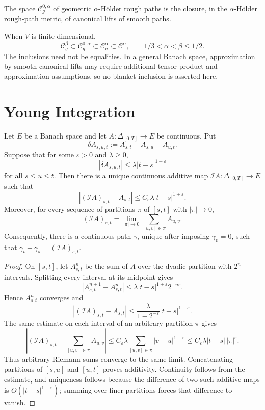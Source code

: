 \begin{de}
The space $\mathscr C_g^{0,\alpha}$ of geometric $\alpha$-Hölder rough paths is
the closure, in the $\alpha$-Hölder rough-path metric, of canonical lifts of
smooth paths.
\end{de}

\begin{remark}
When $V$ is finite-dimensional,
\[
  \mathscr C_g^\beta\subset\mathscr C_g^{0,\alpha}
  \subset\mathscr C_g^\alpha\subset\mathscr C^\alpha,
  \qquad 1/3<\alpha<\beta\le1/2.
\]
The inclusions need not be equalities.  In a general Banach space, approximation
by smooth canonical lifts may require additional tensor-product and
approximation assumptions, so no blanket inclusion is asserted here.
\end{remark}

\section{Young Integration}

\begin{thm}
Let $E$ be a Banach space and let
$A\colon\Delta_{[0,T]}\to E$ be continuous.  Put
\[
  \delta A_{s,u,t}:=A_{s,t}-A_{s,u}-A_{u,t}.
\]
Suppose that for some $\varepsilon>0$ and $\lambda\ge0$,
\[
  |\delta A_{s,u,t}|\le\lambda|t-s|^{1+\varepsilon}
\]
for all $s\le u\le t$.  Then there is a unique continuous additive map
$\mathcal I A\colon\Delta_{[0,T]}\to E$ such that
\[
  |(\mathcal I A)_{s,t}-A_{s,t}|
  \le C_\varepsilon\lambda|t-s|^{1+\varepsilon}.
\]
Moreover, for every sequence of partitions $\pi$ of $[s,t]$ with
$|\pi|\to0$,
\[
  (\mathcal I A)_{s,t}
  =\lim_{|\pi|\to0}\sum_{[u,v]\in\pi}A_{u,v}.
\]
Consequently, there is a continuous path $\gamma$, unique after imposing
$\gamma_0=0$, such that $\gamma_t-\gamma_s=(\mathcal I A)_{s,t}$.
\end{thm}

\begin{proof}
On $[s,t]$, let $A^n_{s,t}$ be the sum of $A$ over the dyadic partition with
$2^n$ intervals.  Splitting every interval at its midpoint gives
\[
  |A^{n+1}_{s,t}-A^n_{s,t}|
  \le \lambda|t-s|^{1+\varepsilon}2^{-n\varepsilon}.
\]
Hence $A^n_{s,t}$ converges and
\[
  |(\mathcal I A)_{s,t}-A_{s,t}|
  \le \frac{\lambda}{1-2^{-\varepsilon}}|t-s|^{1+\varepsilon}.
\]
The same estimate on each interval of an arbitrary partition $\pi$ gives
\[
  \left|(\mathcal I A)_{s,t}-\sum_{[u,v]\in\pi}A_{u,v}\right|
  \le C_\varepsilon\lambda
      \sum_{[u,v]\in\pi}|v-u|^{1+\varepsilon}
  \le C_\varepsilon\lambda|t-s|\,|\pi|^\varepsilon.
\]
Thus arbitrary Riemann sums converge to the same limit.  Concatenating
partitions of $[s,u]$ and $[u,t]$ proves additivity.  Continuity follows from
the estimate, and uniqueness follows because the difference of two such
additive maps is $O(|t-s|^{1+\varepsilon})$; summing over finer partitions
forces that difference to vanish.
\end{proof}

